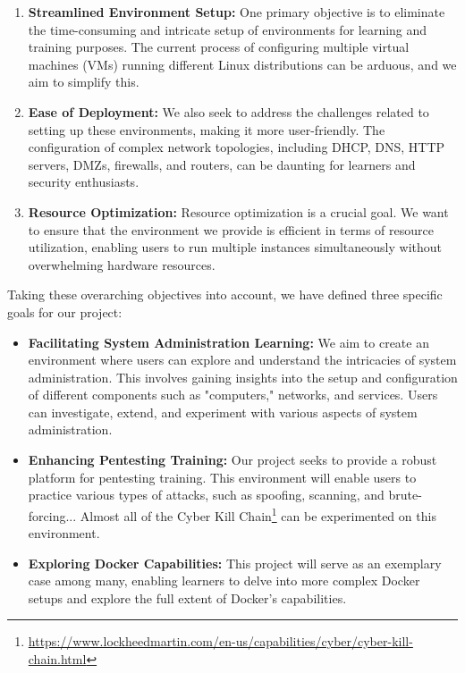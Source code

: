 \documentclass[a4paper,11pt,singlespacing]{article}
\begin{document}
\begin{enumerate}
    \item \textbf{Streamlined Environment Setup:} One primary objective is to eliminate the time-consuming and intricate setup of environments for learning and training purposes. The current process of configuring multiple virtual machines (VMs) running different Linux distributions can be arduous, and we aim to simplify this.
    
    \item \textbf{Ease of Deployment:} We also seek to address the challenges related to setting up these environments, making it more user-friendly. The configuration of complex network topologies, including DHCP, DNS, HTTP servers, DMZs, firewalls, and routers, can be daunting for learners and security enthusiasts.
    
    \item \textbf{Resource Optimization:} Resource optimization is a crucial goal. We want to ensure that the environment we provide is efficient in terms of resource utilization, enabling users to run multiple instances simultaneously without overwhelming hardware resources.
\end{enumerate}

Taking these overarching objectives into account, we have defined three specific goals for our project:

\begin{itemize}
    \item \textbf{Facilitating System Administration Learning:} We aim to create an environment where users can explore and understand the intricacies of system administration. This involves gaining insights into the setup and configuration of different components such as "computers," networks, and services. Users can investigate, extend, and experiment with various aspects of system administration.

    \item \textbf{Enhancing Pentesting Training:} Our project seeks to provide a robust platform for pentesting training. This environment will enable users to practice various types of attacks, such as spoofing, scanning, and brute-forcing... Almost all of the Cyber Kill Chain\footnote{\url{https://www.lockheedmartin.com/en-us/capabilities/cyber/cyber-kill-chain.html}} can be experimented on this environment.

    \item \textbf{Exploring Docker Capabilities:} This project will serve as an exemplary case among many, enabling learners to delve into more complex Docker setups and explore the full extent of Docker's capabilities.

\end{itemize}
\end{document}
